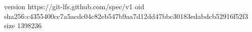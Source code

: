 version https://git-lfs.github.com/spec/v1
oid sha256:c4355400cc7a5acdc04c82eb547b9aa7d12dd47bbc30183edabdcb52916f52f3
size 1398236
